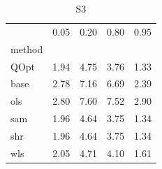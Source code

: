 \begin{table}
\caption{S3}
\label{ }
\begin{tabular}{lrrrr}
\toprule
 & 0.05 & 0.20 & 0.80 & 0.95 \\
method &  &  &  &  \\
\midrule
QOpt & 1.94 & 4.75 & 3.76 & 1.33 \\
base & 2.78 & 7.16 & 6.69 & 2.39 \\
ols & 2.80 & 7.60 & 7.52 & 2.90 \\
sam & 1.96 & 4.64 & 3.75 & 1.34 \\
shr & 1.96 & 4.64 & 3.75 & 1.34 \\
wls & 2.05 & 4.71 & 4.10 & 1.61 \\
\bottomrule
\end{tabular}
\end{table}
